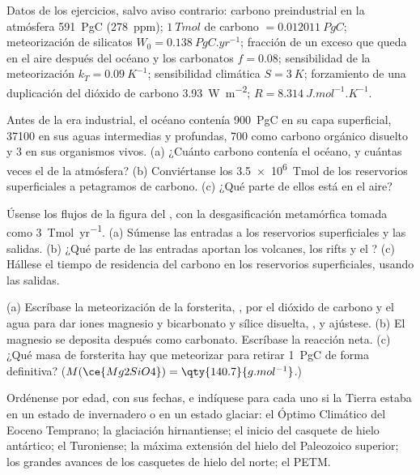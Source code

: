 Datos de los ejercicios, salvo aviso contrario: carbono preindustrial en la atmósfera
\qty{591}{PgC} (\qty{278}{ppm}); $\qty{1}{Tmol}$ de carbono $= \qty{0.012011}{PgC}$; meteorización de
silicatos $W_0 = \qty{0.138}{PgC.yr^{-1}}$; fracción de un exceso que queda en el aire después del océano y los
carbonatos $f = 0.08$; sensibilidad de la meteorización $k_T = \qty{0.09}{K^{-1}}$; sensibilidad climática $S =
\qty{3}{K}$; forzamiento de una duplicación del dióxido de carbono \qty{3.93}{W.m^{-2}}; $R =
\qty{8.314}{J.mol^{-1}.K^{-1}}$.

\begin{exercise}[$\star$]\label{exo:b2:deep-time-climate:1}
Antes de la era industrial, el océano contenía \qty{900}{PgC} en su capa superficial, \num{37100} en sus
aguas intermedias y profundas, 700 como carbono orgánico disuelto y 3 en sus organismos vivos.
(a) ¿Cuánto carbono contenía el océano, y cuántas veces el de la atmósfera? (b) Conviértanse los
\qty{3.5e6}{Tmol} de los reservorios superficiales a petagramos de carbono. (c) ¿Qué parte de ellos está en el
aire?
\end{exercise}

\begin{exercise}[$\star$]\label{exo:b2:deep-time-climate:2}
Úsense los flujos de la figura del , con la desgasificación metamórfica tomada como
\qty{3}{Tmol.yr^{-1}}. (a) Súmense las entradas a los reservorios superficiales y las salidas.
(b) ¿Qué parte de las entradas aportan los volcanes, los rifts y el ? (c) Hállese el tiempo de residencia
del carbono en los reservorios superficiales, usando las salidas.
\end{exercise}

\begin{exercise}[$\star$]\label{exo:b2:deep-time-climate:3}
(a) Escríbase la meteorización de la forsterita, , por el dióxido de carbono y el agua para dar iones magnesio
y bicarbonato y sílice disuelta, , y ajústese. (b) El magnesio se deposita después
como carbonato. Escríbase la reacción neta. (c) ¿Qué masa de forsterita hay que meteorizar para
retirar \qty{1}{PgC} de forma definitiva? ($M(\ce{Mg2SiO4}) = \qty{140.7}{g.mol^{-1}}$.)
\end{exercise}

\begin{exercise}[$\star$]\label{exo:b2:deep-time-climate:4}
Ordénense por edad, con sus fechas, e indíquese para cada uno si la Tierra estaba en un estado de invernadero o en un
estado glaciar: el Óptimo Climático del Eoceno Temprano; la glaciación hirnantiense; el inicio del casquete de hielo
antártico; el Turoniense; la máxima extensión del hielo del Paleozoico superior; los grandes
avances de los casquetes de hielo del norte; el PETM.
\end{exercise}

